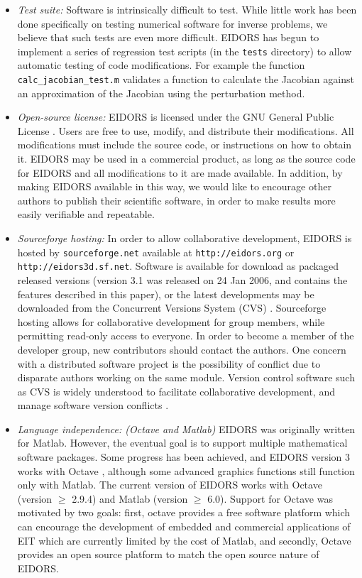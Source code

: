 \documentclass[12pt]{iopart}
\begin{document}
\begin{itemize}
  \item {\em Test suite:}
Software is intrinsically difficult to test. While little work
has been done specifically on testing numerical software
for inverse problems, we
believe that such tests are even more difficult.
EIDORS has begun to implement a series of regression test
scripts (in the {\tt tests} directory)
to allow automatic testing of code modifications.
For example the function {\tt calc\_jacobian\_test.m}
validates a function to calculate the Jacobian against
an approximation of the Jacobian using the perturbation method. 

  \item {\em Open-source license:}
EIDORS is licensed under the
GNU General Public License \cite{Free_Software_Foundation_1991}.
Users are free to use, modify, and
distribute their modifications. All modifications must include the
source code, or instructions on how to obtain it. EIDORS may be used
in a commercial product, as long as the source code for EIDORS and all
modifications to it are made available.
In addition, by making EIDORS available in this way,
we would like to encourage other authors to publish
their scientific software, in order to make results
more easily verifiable and repeatable.

  \item {\em Sourceforge hosting:}
In order to allow collaborative development, 
EIDORS is hosted by {\tt sourceforge.net}
available at {\tt http://eidors.org} or {\tt http://eidors3d.sf.net}.
Software is available for download as packaged released versions
(version 3.1 was released on 24 Jan 2006, and
contains the features described in this paper),
or the latest developments may be downloaded from the
Concurrent Versions System (CVS) \cite{Cederqvist_2002}.
Sourceforge hosting allows for collaborative development for
group members, while permitting read-only access to everyone.
In order to become a member of the developer group, new
contributors should contact the authors.
One concern with a distributed software project is
the possibility of conflict due to disparate authors
working on the same module.
Version control software such as CVS is widely understood
to facilitate collaborative development, and manage
software version conflicts \cite{Cederqvist_2002}.


  \item {\em Language independence: (Octave and Matlab)}
EIDORS was originally written for Matlab.
However, the eventual goal is to support multiple
mathematical software packages.
Some progress has been achieved, and EIDORS version 3
works with Octave \cite{Eaton_2002}, although some 
advanced graphics functions still function only with Matlab.
The current version of EIDORS works with Octave
(version $\ge$ 2.9.4)
and Matlab (version $\ge$ 6.0).
Support for Octave was motivated by two goals:
first, octave provides a free software platform
which can encourage the development of embedded
and commercial applications of EIT which are
currently
limited by the cost of Matlab, and secondly,
Octave provides an open source platform to match
the open source nature of EIDORS.


\end{itemize}
\end{document}
